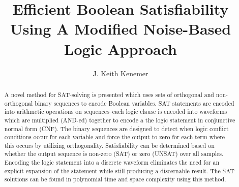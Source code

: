 \documentclass[reqno]{amsart}
\theoremstyle{definition}
\theoremstyle{remark}
\begin{document}

\title{Efficient Boolean Satisfiability Using A Modified Noise-Based Logic Approach }

\author{J. Keith Kenemer}






\begin{abstract}
A novel method for SAT-solving is presented which uses sets of orthogonal and non-orthogonal binary sequences to encode Boolean variables. SAT statements are encoded into arithmetic operations on sequences--each logic clause is encoded into waveforms which are multiplied (AND-ed) together to encode a the logic statement in conjunctive normal form (CNF).  The binary sequences are designed to detect when logic conflict conditions occur for each variable and force the output to zero for each term where this occurs by utilizing orthogonality. Satisfiability can be determined based on whether the output sequence is non-zero (SAT) or zero (UNSAT) over all samples. Encoding the logic statement into a discrete waveform eliminates the need for an explicit expansion of the statement while still producing a discernable result. The SAT solutions can be found in polynomial time and space complexity using this method.

\end{abstract}

\end{document}
